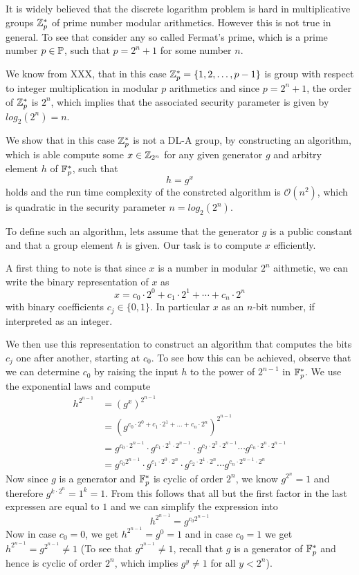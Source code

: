 \begin{example} It is widely believed that the discrete logarithm problem is hard in multiplicative groups $\mathbb{Z}_p^*$ of prime number modular arithmetics. However this is not true in general. To see that consider any so called Fermat's prime, which is a prime number $p\in\mathbb{P}$, such that $p=2^n+1$ for some number $n$.

We know from XXX, that in this case $\mathbb{Z}_p^* = \{1,2,\ldots, p-1\}$ is group with respect to integer multiplication in modular $p$ arithmetics and since $p=2^n+1$, the order of $\mathbb{Z}_p^*$ is $2^n$, which implies that the associated security parameter is given by $log_2(2^n)=n$.

We show that in this case $\mathbb{Z}_p^*$ is not a DL-A group, by constructing an algorithm, which is able compute some $x\in\mathbb{Z}_{2^n}$ for any given generator $g$ and arbitry element $h$ of $\mathbb{F}_p^*$, such that
$$
h = g^x
$$
holds and the run time complexity of the constrcted algorithm is $\mathcal{O}(n^2)$, which is quadratic in the security parameter $n=log_2(2^n)$.  

To define such an algorithm, lets assume that the generator $g$ is a public constant and that a group element $h$ is given. Our task is to compute $x$ efficiently. 

A first thing to note is that since $x$ is a number in modular $2^n$ aithmetic, we can write the binary representation of $x$ as
$$
x = c_0\cdot 2^0 + c_1\cdot 2^1 + \cdots + c_n \cdot 2^n
$$
with binary coefficients $c_j\in\{0,1\}$. In particular $x$ as an $n$-bit number, if interpreted as an integer. 

We then use this representation to construct an algorithm that computes the bits $c_j$ one after another, starting at $c_0$. To see how this can be achieved, observe that we can determine $c_0$ by raising the input $h$ to the power of $2^{n-1}$ in $\mathbb{F}_p^*$. We use the exponential laws and compute 
\begin{align*}
h^{2^{n-1}} & = \left(g^x\right)^{2^{n-1}}\\
            & = \left(g^{c_0\cdot 2^0 + c_1\cdot 2^1 + \ldots + c_n\cdot 2^n}\right)^{2^{n-1}}\\
            & = g^{c_0\cdot 2^{n-1}}\cdot g^{c_1\cdot 2^1\cdot 2^{n-1}} \cdot 
            g^{c_2\cdot 2^2\cdot 2^{n-1}} \cdots g^{c_n\cdot 2^n\cdot 2^{n-1}}\\
            & = g^{c_0 2^{n-1}}\cdot g^{c_1\cdot 2^0\cdot 2^{n}} \cdot
            g^{c_2\cdot 2^1\cdot 2^{n}} \cdots g^{c_n\cdot 2^{n-1}\cdot 2^{n}}
\end{align*}
Now since $g$ is a generator and $\mathbb{F}_p^*$ is cyclic of order $2^n$, we know $g^{2^n}=1$ and therefore $g^{k\cdot 2^n}= 1^k=1$. From this follows that all but the first factor in the last expressen are equal to $1$ and we can simplify the expression into
$$
h^{2^{n-1}} = g^{c_0 2^{n-1}}
$$ 
Now in case $c_0=0$, we get $h^{2^{n-1}} = g^0=1$ and in case $c_0=1$ we get 
$h^{2^{n-1}} = g^{2^{n-1}}\neq 1$ (To see that $g^{2^{n-1}}\neq 1$, recall that $g$ is a generator of $\mathbb{F}_p^*$ and hence is cyclic of order $2^n$, which implies $g^y\neq 1$ for all $y<2^n$).


\end{example}
